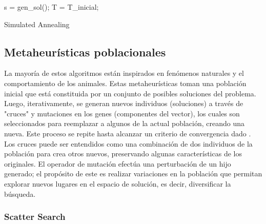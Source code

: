 \documentclass{ci5652}
\begin{document}
\begin{algorithm}
 \DontPrintSemicolon
 \vspace*{0.1cm}
  s = gen\_sol();\;
  T = T\_inicial;\;
 \vspace*{0.1cm}
 \caption{Simulated Annealing}
\end{algorithm}


\subsection{Metaheurísticas poblacionales}

La mayoría de estos algoritmos están inspirados en fenómenos naturales y el
comportamiento de los animales. Estas metaheurísticas toman una población
inicial que está constituida por un conjunto de posibles soluciones del 
problema. Luego, iterativamente, se generan nuevos individuos (soluciones) a
través de "cruces" y mutaciones en los genes (componentes del vector), los 
cuales son seleccionados para reemplazar a algunos de la actual población,
creando una nueva. Este proceso se repite hasta alcanzar un criterio de 
convergencia dado \cite{Talbi_2009}.\\ 

Los cruces puede ser entendidos como una combinación de dos individuos de la
población para crea otros nuevos, preservando algunas características de los
originales. El operador de mutación efectúa una perturbación de un hijo 
generado; el propósito de este es realizar variaciones en la población que
permitan explorar nuevos lugares en el espacio de solución, es decir, 
diversificar la búsqueda. 


\subsubsection{Scatter Search}
\end{document}

